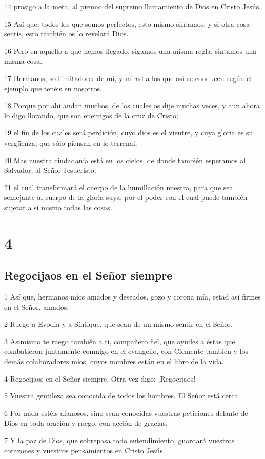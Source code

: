 \par 14 prosigo a la meta, al premio del supremo llamamiento de Dios en Cristo Jesús.
\par 15 Así que, todos los que somos perfectos, esto mismo sintamos; y si otra cosa sentís, esto también os lo revelará Dios.
\par 16 Pero en aquello a que hemos llegado, sigamos una misma regla, sintamos una misma cosa.
\par 17 Hermanos, sed imitadores de mí, y mirad a los que así se conducen según el ejemplo que tenéis en nosotros.
\par 18 Porque por ahí andan muchos, de los cuales os dije muchas veces, y aun ahora lo digo llorando, que son enemigos de la cruz de Cristo;
\par 19 el fin de los cuales será perdición, cuyo dios es el vientre, y cuya gloria es su vergüenza; que sólo piensan en lo terrenal.
\par 20 Mas nuestra ciudadanía está en los cielos, de donde también esperamos al Salvador, al Señor Jesucristo;
\par 21 el cual transformará el cuerpo de la humillación nuestra, para que sea semejante al cuerpo de la gloria suya, por el poder con el cual puede también sujetar a sí mismo todas las cosas.

\chapter{4}

\section*{Regocijaos en el Señor siempre}

\par 1 Así que, hermanos míos amados y deseados, gozo y corona mía, estad así firmes en el Señor, amados.
\par 2 Ruego a Evodia y a Síntique, que sean de un mismo sentir en el Señor.
\par 3 Asimismo te ruego también a ti, compañero fiel, que ayudes a éstas que combatieron juntamente conmigo en el evangelio, con Clemente también y los demás colaboradores míos, cuyos nombres están en el libro de la vida.
\par 4 Regocijaos en el Señor siempre. Otra vez digo: ¡Regocijaos!
\par 5 Vuestra gentileza sea conocida de todos los hombres. El Señor está cerca.
\par 6 Por nada estéis afanosos, sino sean conocidas vuestras peticiones delante de Dios en toda oración y ruego, con acción de gracias.
\par 7 Y la paz de Dios, que sobrepasa todo entendimiento, guardará vuestros corazones y vuestros pensamientos en Cristo Jesús.

